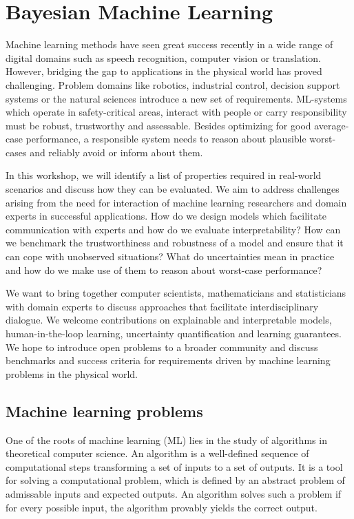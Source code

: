 \chapter{Bayesian Machine Learning}
\label{toc:bayesian_ml}


Machine learning methods have seen great success recently in a wide range of digital domains such as speech recognition, computer vision or translation.
However, bridging the gap to applications in the physical world has proved challenging.
Problem domains like robotics, industrial control, decision support systems or the natural sciences introduce a new set of requirements.
ML-systems which operate in safety-critical areas, interact with people or carry responsibility must be robust, trustworthy and assessable.
Besides optimizing for good average-case performance, a responsible system needs to reason about plausible worst-cases and reliably avoid or inform about them.

In this workshop, we will identify a list of properties required in real-world scenarios and discuss how they can be evaluated.
We aim to address challenges arising from the need for interaction of machine learning researchers and domain experts in successful applications.
How do we design models which facilitate communication with experts and how do we evaluate interpretability?
How can we benchmark the trustworthiness and robustness of a model and ensure that it can cope with unobserved situations?
What do uncertainties mean in practice and how do we make use of them to reason about worst-case performance?

We want to bring together computer scientists, mathematicians and statisticians with domain experts to discuss approaches that facilitate interdisciplinary dialogue.
We welcome contributions on explainable and interpretable models, human-in-the-loop learning, uncertainty quantification and learning guarantees.
We hope to introduce open problems to a broader community and discuss benchmarks and success criteria for requirements driven by machine learning problems in the physical world.

\section{Machine learning problems}
\label{toc:bayesian_ml:ml_problems}
One of the roots of machine learning (ML) lies in the study of algorithms in theoretical computer science.
An algorithm is a well-defined sequence of computational steps transforming a set of inputs to a set of outputs.
It is a tool for solving a computational problem, which is defined by an abstract problem of admissable inputs and expected outputs.
An algorithm solves such a problem if for every possible input, the algorithm provably yields the correct output.

